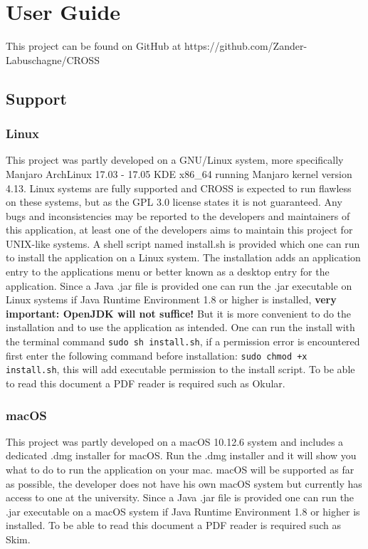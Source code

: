\documentclass[11pt]{article}
\newcommand{\code}[1]{\texttt{#1}}
\begin{document}
	\section{User Guide}
	This project can be found on GitHub at https://github.com/Zander-Labuschagne/CROSS
		\subsection{Support}
			\subsubsection{Linux}
				This project was partly developed on a GNU/Linux system, more specifically Manjaro ArchLinux 17.03 - 17.05 KDE x86\_64 running Manjaro kernel version 4.13. Linux systems are fully supported and CROSS is expected to run flawless on these systems, but as the GPL 3.0 license states it is not guaranteed. Any bugs and inconsistencies may be reported to the developers and maintainers of this application, at least one of the developers aims to maintain this project for UNIX-like systems. A shell script named install.sh is provided which one can run to install the application on a Linux system. The installation adds an application entry to the applications menu or better known as a desktop entry for the application. Since a Java .jar file is provided one can run the .jar executable on Linux systems if Java Runtime Environment 1.8 or higher is installed, \textbf{very important: OpenJDK will not suffice!} But it is more convenient to do the installation and to use the application as intended. One can run the install with the terminal command \code{sudo sh install.sh}, if a permission error is encountered first enter the following command before installation: \code{sudo chmod +x install.sh}, this will add executable permission to the install script. To be able to read this document a PDF reader is required such as Okular.

			\subsubsection{macOS}
				This project was partly developed on a macOS 10.12.6 system and includes a dedicated .dmg installer for macOS. Run the .dmg installer and it will show you what to do to run the application on your mac. macOS will be supported as far as possible, the developer does not have his own macOS system but currently has access to one at the university. Since a Java .jar file is provided one can run the .jar executable on a macOS system if Java Runtime Environment 1.8 or higher is installed. To be able to read this document a PDF reader is required such as Skim.
\end{document}
